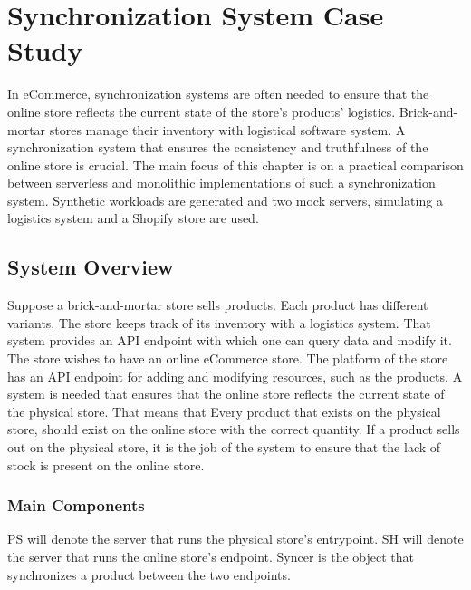 \chapter{Synchronization System Case Study}
\etocsettocstyle{\rule{\textwidth}{1pt}}{\rule{\textwidth}{1pt}} %
\localtableofcontents
\label{chap:synchronization}

In eCommerce, synchronization systems are often needed to ensure that the online store reflects the current state of the store's products' logistics. Brick-and-mortar stores manage their inventory with logistical software system. A synchronization system that ensures the consistency and truthfulness of the online store is crucial.
The main focus of this chapter is on a practical comparison between serverless and monolithic implementations of such a synchronization system. Synthetic workloads are generated and two mock servers, simulating a logistics system and a Shopify store are used.

\section{System Overview}
Suppose a brick-and-mortar store sells products. Each product has different variants. The store keeps track of its inventory with a logistics system. That system provides an API endpoint with which one can query data and modify it.
The store wishes to have an online eCommerce store. The platform of the store has an API endpoint for adding and modifying resources, such as the products.
A system is needed that ensures that the online store reflects the current state of the physical store. That means that Every product that exists on the physical store, should exist on the online store with the correct quantity. If a product sells out on the physical store, it is the job of the system to ensure that the lack of stock is present on the online store.
\subsection{Main Components}
PS will denote the server that runs the physical store's entrypoint.
SH will denote the server that runs the online store's endpoint. 
Syncer is the object that synchronizes a product between the two endpoints.


